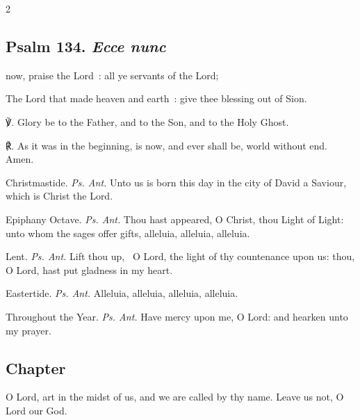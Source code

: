 \begin{multicols}{2}
\subsection{Psalm 134. \textit{Ecce nunc}}

 now, praise the Lord~: all ye servants of the Lord;\par
{}
The Lord that made heaven and earth~: give thee blessing out of Sion.\par
℣. Glory be to the Father, and to the Son, and to the Holy Ghost.\par
℟. As it was in the beginning, is now, and ever shall be, world without end. Amen.\\
\par\noindent
{\color{RubricRed}Christmastide.} \textit{Ps. Ant.} Unto us is born this day in the city of David a Saviour, which is Christ the Lord.%
\par\noindent
{\color{RubricRed}Epiphany Octave.} \textit{Ps. Ant.} Thou hast appeared, O Christ, thou Light of Light: unto whom the sages offer gifts, alleluia, alleluia, alleluia.%
\par\noindent
{\color{RubricRed}Lent.} \textit{Ps. Ant.} Lift thou up,~{\dag} O Lord, the light of thy countenance upon us: thou, O Lord, hast put gladness in my heart.%
\par\noindent
{\color{RubricRed}Eastertide.} \textit{Ps. Ant.} Alleluia, alleluia, alleluia, alleluia.
\par\noindent
{\color{RubricRed}Throughout the Year.} \textit{Ps. Ant.} Have mercy upon me, O Lord: and hearken unto my prayer.



\subsection{Chapter}

 O Lord, art in the midst of us, and we are called by thy name. Leave us not, O Lord our God. \par
{}


\end{multicols}
